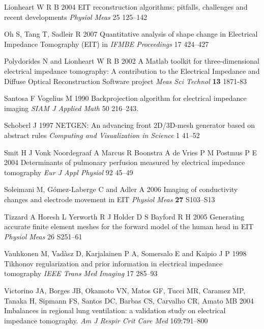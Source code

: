 \documentclass[12pt]{iopart}
\begin{document}
\item[]
Lionheart W R B 2004
EIT reconstruction algorithms: pitfalls, challenges
and recent developments
{\em Physiol Meas}
25 125--142

\item[]
Oh S, Tang T, Sadleir R 2007
Quantitative analysis of shape change in Electrical Impedance Tomography (EIT)
in {\em IFMBE Proceedings}
17 424--427

\item[]
Polydorides N and Lionheart W R B 2002 A Matlab toolkit for
three-dimensional electrical impedance tomography: A contribution
to the Electrical Impedance and Diffuse Optical Reconstruction
Software project {\em Meas Sci Technol} {\bf 13} 1871-83

\item[]
Santosa F Vogelius M 1990
Backprojection algorithm for electrical impedance imaging
{\em SIAM J Applied Math}
50 216--243. 

\item[]
Schoberl J 1997
NETGEN: An advancing front 2D/3D-mesh generator based on abstract rules
{\em Computing and Visualization in Science}
1 41--52 

\item[]
Smit H J
Vonk Noordegraaf A
Marcus R
Boonstra A
de Vries P M 
Postmus P E
2004
Determinants of pulmonary perfusion measured by electrical impedance tomography
{\em Eur J Appl Physiol}
92 45--49

\item[]
Soleimani M, G\'omez-Laberge C and Adler A 2006 Imaging of
conductivity changes and electrode movement in EIT
{\em Physiol Meas} {\bf 27}
S103--S13

\item[]
Tizzard A Horesh L Yerworth R J Holder D S Bayford R H 2005
Generating accurate finite element meshes for the forward
model of the human head in EIT
{\em Physiol Meas}
 26 S251--61 

\item[]
Vauhkonen M, Vad\`asz D, Karjalainen P A, Somersalo E and
Kaipio J P 1998
Tikhonov regularization and prior information in
electrical impedance tomography
 {\em IEEE Trans Med Imaging}
17 285--93

\item[]
Victorino JA, Borges JB, Okamoto VN, Matos GF, Tucci MR, Caramez MP, Tanaka H, Sipmann FS, Santos DC, Barbas CS, Carvalho CR, Amato MB 2004
Imbalances in regional lung ventilation: a validation study on
electrical impedance tomography.
{\em Am J Respir Crit Care Med} 169:791--800
\end{document}
